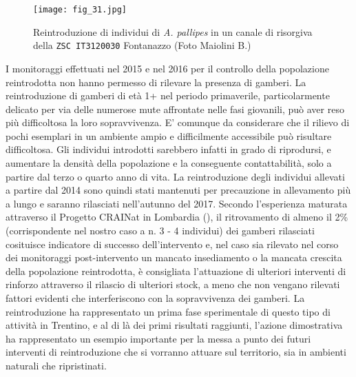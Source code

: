 \documentclass[11pt,a4paper,italian,twoside,openany]{memoir}
\begin{document}
\begin{figure}[!h]
  \centering
  \texttt{[image: fig\_31.jpg]}
  \caption{Reintroduzione di individui di \emph{A. pallipes} in un canale di risorgiva della \texttt{ZSC IT3120030} Fontanazzo (Foto Maiolini B.)}
  \label{fig_31}
\end{figure}

I monitoraggi effettuati nel 2015 e nel 2016 per il controllo della popolazione reintrodotta non hanno permesso di rilevare la presenza di gamberi. La reintroduzione di gamberi di età 1+ nel periodo primaverile, particolarmente delicato per via delle numerose mute affrontate nelle fasi giovanili, può aver reso più difficoltosa la loro sopravvivenza. E' comunque da considerare che il rilievo di pochi esemplari in un ambiente ampio e difficilmente accessibile può risultare difficoltosa. Gli individui introdotti sarebbero infatti in grado di riprodursi, e aumentare la densità della popolazione e la conseguente contattabilità, solo a partire dal terzo o quarto anno di vita. La reintroduzione degli individui allevati a partire dal 2014 sono quindi stati mantenuti per precauzione in allevamento più a lungo e saranno rilasciati nell'autunno del 2017. Secondo l'esperienza maturata attraverso il Progetto CRAINat in Lombardia (\cite{CRAINAT}), il ritrovamento di almeno il 2\% (corrispondente nel nostro caso a n. 3 - 4 individui) dei gamberi rilasciati cosituisce indicatore di successo dell'intervento e, nel caso sia rilevato nel corso dei monitoraggi post-intervento un mancato insediamento o la mancata crescita della popolazione reintrodotta, è consigliata l'attuazione di ulteriori interventi di rinforzo attraverso il rilascio di ulteriori stock, a meno che non vengano rilevati fattori evidenti che interferiscono con la sopravvivenza dei gamberi. La reintroduzione ha rappresentato un prima fase sperimentale di questo tipo di attività in Trentino, e al di là dei primi risultati raggiunti, l'azione dimostrativa ha rappresentato un esempio importante per la messa a punto dei futuri interventi di reintroduzione che si vorranno attuare sul territorio, sia in ambienti naturali che ripristinati.
\end{document}
